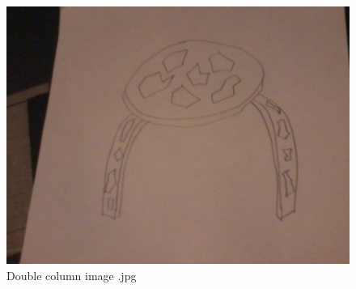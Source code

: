 \begin{figure}
\centering
\includegraphics[width=160mm]{img/img}
\caption{Double column image .jpg}
\end{figure}
